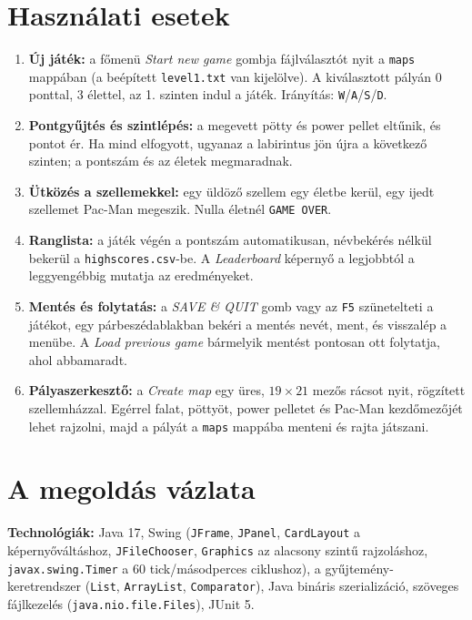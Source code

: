 \documentclass[11pt, a4paper]{article}
\begin{document}
\section{Használati esetek}
\begin{enumerate}[itemsep=2pt]
    \item \textbf{Új játék:} a főmenü \textit{Start new game} gombja fájlválasztót nyit a \texttt{maps} mappában (a beépített \texttt{level1.txt} van kijelölve). A kiválasztott pályán 0 ponttal, 3 élettel, az 1. szinten indul a játék. Irányítás: \texttt{W}/\texttt{A}/\texttt{S}/\texttt{D}.
    \item \textbf{Pontgyűjtés és szintlépés:} a megevett pötty és power pellet eltűnik, és pontot ér. Ha mind elfogyott, ugyanaz a labirintus jön újra a következő szinten; a pontszám és az életek megmaradnak.
    \item \textbf{Ütközés a szellemekkel:} egy üldöző szellem egy életbe kerül, egy ijedt szellemet Pac-Man megeszik. Nulla életnél \texttt{GAME OVER}.
    \item \textbf{Ranglista:} a játék végén a pontszám automatikusan, névbekérés nélkül bekerül a \texttt{highscores.csv}-be. A \textit{Leaderboard} képernyő a legjobbtól a leggyengébbig mutatja az eredményeket.
    \item \textbf{Mentés és folytatás:} a \textit{SAVE \& QUIT} gomb vagy az \texttt{F5} szünetelteti a játékot, egy párbeszédablakban bekéri a mentés nevét, ment, és visszalép a menübe. A \textit{Load previous game} bármelyik mentést pontosan ott folytatja, ahol abbamaradt.
    \item \textbf{Pályaszerkesztő:} a \textit{Create map} egy üres, $19 \times 21$ mezős rácsot nyit, rögzített szellemházzal. Egérrel falat, pöttyöt, power pelletet és Pac-Man kezdőmezőjét lehet rajzolni, majd a pályát a \texttt{maps} mappába menteni és rajta játszani.
\end{enumerate}

\section{A megoldás vázlata}
\textbf{Technológiák:} Java 17, Swing (\texttt{JFrame}, \texttt{JPanel}, \texttt{CardLayout} a képernyőváltáshoz, \texttt{JFileChooser}, \texttt{Graphics} az alacsony szintű rajzoláshoz, \texttt{javax.swing.Timer} a 60 tick/másodperces ciklushoz), a gyűjtemény-keretrendszer (\texttt{List}, \texttt{ArrayList}, \texttt{Comparator}), Java bináris szerializáció, szöveges fájlkezelés (\texttt{java.nio.file.Files}), JUnit 5.
\end{document}
